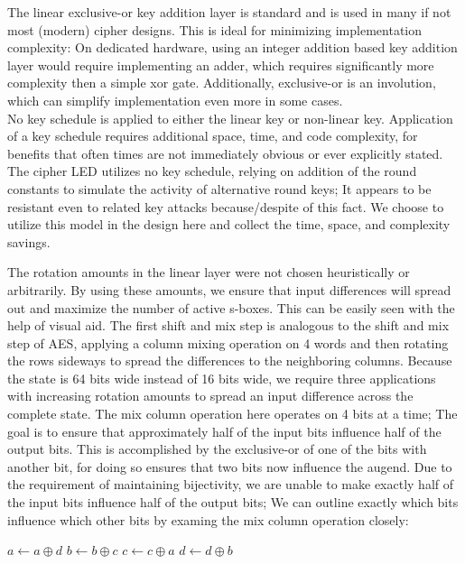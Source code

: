 \documentclass[preprint]{iacrtrans}
\begin{document}
The linear exclusive-or key addition layer is standard and is used in many if not most (modern) cipher designs. This is ideal for minimizing implementation complexity: On dedicated hardware, using an integer addition based key addition layer would require implementing an adder, which requires significantly more complexity then a simple xor gate. Additionally, exclusive-or is an involution, which can simplify implementation even more in some cases. \\

No key schedule is applied to either the linear key or non-linear key. Application of a key schedule requires additional space, time, and code complexity, for benefits that often times are not immediately obvious or ever explicitly stated. The cipher LED utilizes no key schedule, relying on addition of the round constants to simulate the activity of alternative round keys; It appears to be resistant even to related key attacks because/despite of this fact. We choose to utilize this model in the design here and collect the time, space, and complexity savings.

The rotation amounts in the linear layer were not chosen heuristically or arbitrarily. By using these amounts, we ensure that input differences will spread out and maximize the number of active s-boxes. This can be easily seen with the help of visual aid. The first shift and mix step is analogous to the shift and mix step of AES, applying a column mixing operation on 4 words and then rotating the rows sideways to spread the differences to the neighboring columns. Because the state is 64 bits wide instead of 16 bits wide, we require three applications with increasing rotation amounts to spread an input difference across the complete state. The mix column operation here operates on 4 bits at a time; The goal is to ensure that approximately half of the input bits influence half of the output bits. This is accomplished by the exclusive-or of one of the bits with another bit, for doing so ensures that two bits now influence the augend. Due to the requirement of maintaining bijectivity, we are unable to make exactly half of the input bits influence half of the output bits; We can outline exactly which bits influence which other bits by examing the mix column operation closely:

\begin{algorithmic}
	\State $a \gets a \oplus d$ 
	\State $b \gets b \oplus c$ 
	\State $c \gets c \oplus a$ 
	\State $d \gets d \oplus b$ 
\EndFunction
\end{algorithmic}
\end{document}
